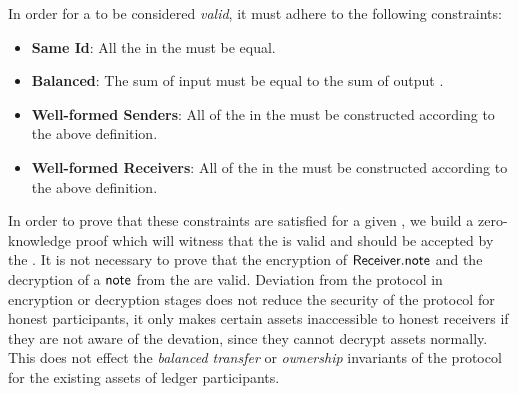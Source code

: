 In order for a \Transfer{} to be considered \emph{valid}, it must adhere to the following constraints:

\begin{itemize}
    \item \textbf{Same Id}: All the  in the \Transfer{} must be equal.
    \item \textbf{Balanced}: The sum of input  must be equal to the sum of output .
    \item \textbf{Well-formed Senders}: All of the  in the \Transfer{} must be constructed according to the above \Sender{} definition.
    \item \textbf{Well-formed Receivers}: All of the  in the \Transfer{} must be constructed according to the above \Receiver{} definition.
\end{itemize}

In order to prove that these constraints are satisfied for a given \Transfer{}, we build a zero-knowledge proof which will witness that the \Transfer{} is valid and should be accepted by the \Ledger{}. It is not necessary to prove that the encryption of ${\textsf{Receiver}}.{\textsf{note}}$ and the decryption of a ${\textsf{note}}$ from the \Ledger{} are valid. Deviation from the protocol in encryption or decryption stages does not reduce the security of the protocol for honest participants, it only makes certain assets inaccessible to honest receivers if they are not aware of the devation, since they cannot decrypt assets normally. This does not effect the \emph{balanced transfer} or \emph{ownership} invariants of the protocol for the existing assets of ledger participants.

